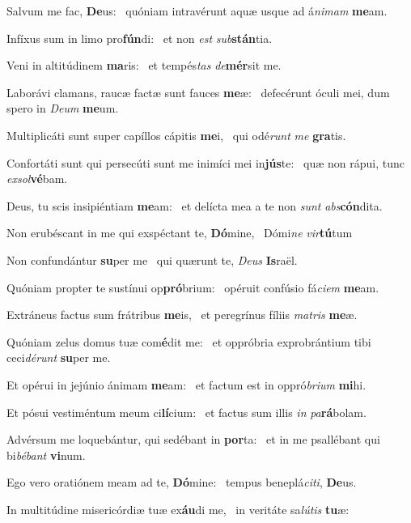 \item Salvum me fac, \textbf{De}us:~\psstar{} quóniam intravérunt aquæ usque ad á\textit{nimam} \textbf{me}am.
\item Infíxus sum in limo pro\textbf{fún}di:~\psstar{} et non \textit{est} \textit{sub}\textbf{stán}tia.
\item Veni in altitúdinem \textbf{ma}ris:~\psstar{} et tempés\textit{tas} \textit{de}\textbf{mér}sit me.
\item Laborávi clamans, raucæ factæ sunt fauces \textbf{me}æ:~\psstar{} defecérunt óculi mei, dum spero in \textit{Deum} \textbf{me}um.
\item Multiplicáti sunt super capíllos cápitis \textbf{me}i,~\psstar{} qui odé\textit{runt} \textit{me} \textbf{gra}tis.
\item Confortáti sunt qui persecúti sunt me inimíci mei in\textbf{jús}te:~\psstar{} quæ non rápui, tunc \textit{exsol}\textbf{vé}bam.
\item Deus, tu scis insipiéntiam \textbf{me}am:~\psstar{} et delícta mea a te non \textit{sunt} \textit{abs}\textbf{cón}dita.
\item Non erubéscant in me qui exspéctant te, \textbf{Dó}mine,~\psstar{} Dómi\textit{ne} \textit{vir}\textbf{tú}tum
\item Non confundántur \textbf{su}per me~\psstar{} qui quærunt te, \textit{Deus} \textbf{Is}raël.
\item Quóniam propter te sustínui op\textbf{pró}brium:~\psstar{} opéruit confúsio fá\textit{ciem} \textbf{me}am.
\item Extráneus factus sum frátribus \textbf{me}is,~\psstar{} et peregrínus fíliis \textit{matris} \textbf{me}æ.
\item Quóniam zelus domus tuæ com\textbf{é}dit me:~\psstar{} et oppróbria exprobrántium tibi ceci\textit{dérunt} \textbf{su}per me.
\item Et opérui in jejúnio ánimam \textbf{me}am:~\psstar{} et factum est in oppró\textit{brium} \textbf{mi}hi.
\item Et pósui vestiméntum meum ci\textbf{lí}cium:~\psstar{} et factus sum illis \textit{in} \textit{pa}\textbf{rá}bolam.
\item Advérsum me loquebántur, qui sedébant in \textbf{por}ta:~\psstar{} et in me psallébant qui bi\textit{bébant} \textbf{vi}num.
\item Ego vero oratiónem meam ad te, \textbf{Dó}mine:~\psstar{} tempus beneplá\textit{citi}, \textbf{De}us.
\item In multitúdine misericórdiæ tuæ ex\textbf{áu}di me,~\psstar{} in veritáte sa\textit{lútis} \textbf{tu}æ:
